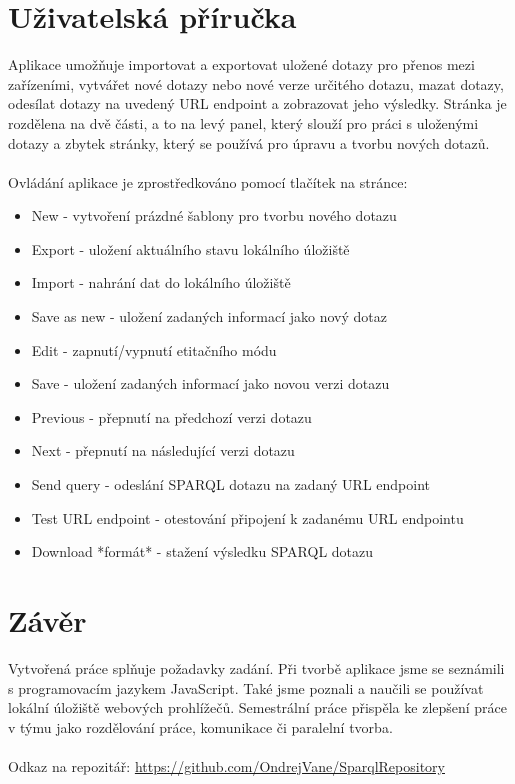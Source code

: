 \documentclass[
12pt,
a4paper,
pdftex,
czech,
titlepage
]{report}
\begin{document}
\chapter{Uživatelská příručka}
Aplikace umožňuje importovat a exportovat uložené dotazy pro přenos mezi zařízeními, vytvářet nové dotazy nebo nové verze určitého dotazu, mazat dotazy, odesílat dotazy na uvedený URL endpoint a zobrazovat jeho výsledky. Stránka je rozdělena na dvě části, a to na levý panel, který slouží pro práci s uloženými dotazy a zbytek stránky, který se používá pro úpravu a tvorbu nových dotazů.\\ \\Ovládání aplikace je zprostředkováno pomocí tlačítek na stránce:
\begin{itemize}
	\item New - vytvoření prázdné šablony pro tvorbu nového dotazu
	\item Export - uložení aktuálního stavu lokálního úložiště
	\item Import - nahrání dat do lokálního úložiště
	\item Save as new - uložení zadaných informací jako nový dotaz
	\item Edit - zapnutí/vypnutí etitačního módu
	\item Save - uložení zadaných informací jako novou verzi dotazu
	\item Previous - přepnutí na předchozí verzi dotazu
	\item Next - přepnutí na následující verzi dotazu
	\item Send query - odeslání SPARQL dotazu na zadaný URL endpoint
	\item Test URL endpoint - otestování připojení k zadanému URL endpointu
	\item Download *formát* - stažení výsledku SPARQL dotazu
\end{itemize}
\chapter{Závěr}
Vytvořená práce splňuje požadavky zadání. Při tvorbě aplikace jsme se seznámili s programovacím jazykem JavaScript. Také jsme poznali a naučili se používat lokální úložiště webových prohlížečů. Semestrální práce přispěla ke zlepšení práce v týmu jako rozdělování práce, komunikace či paralelní tvorba.
\\\\Odkaz na repozitář: \url{https://github.com/OndrejVane/SparqlRepository}
\end{document}
